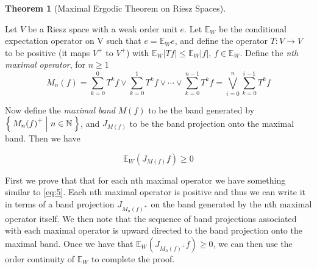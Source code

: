 \documentclass[letterpaper,10pt,oneside,onecolumn,reqno]{amsart}
\newcommand{\E}{\mathbb E}
\newcommand{\NN}{\mathbb N}
\theoremstyle{definition}
\newtheorem{thm}{Theorem}
\newcommand{\join}{\vee}
\begin{document}
\begin{thm}[Maximal Ergodic Theorem on Riesz Spaces]\label{thr:3}

  Let $V$ be a Riesz space with a weak order unit $e$. Let $\E_W$ be
  the conditional expectation operator on V such that $e = \E_W e$,
  and define the operator $T : V \to V$ to be positive (it maps $V^+$
  to $V^+$) with $\E_W|Tf| \leq \E_W|f|$, $f \in \E_W$. Define the
  \emph{nth maximal operator}, for $n \geq
  1$
  \begin{equation}\label{eq:4}
    M_n(f) = \sum\limits_{k=0}^{0} T^k f \join \sum\limits_{k=0}^{1} T^k f \join \cdots \join \sum\limits_{k=0}^{n-1} T^k f = \bigvee_{i=0}^n \sum\limits_{k=0}^{i-1} T^k f
  \end{equation}

  Now define the \emph{maximal band} $M(f)$ to be
  the band generated by $\Set{M_n{(f)}^+ | n \in \NN}$, and $J_{M(f)}$
  to be the band projection onto the maximal band. Then we have

\begin{equation}\label{eq:5}
  \E_W(J_{M(f)}f) \geq 0
\end{equation}
\end{thm}

\begin{framed}
  First we prove that that for each nth maximal operator we have
  something similar to \eqref{eq:5}. Each nth maximal operator is
  positive and thus we can write it in terms of a band projection
  $J_{M_n{(f)}^+}$ on the band generated by the nth maximal operator
  itself. We then note that the sequence of band projections
  associated with each maximal operator is upward directed to the band
  projection onto the maximal band. Once we have that
  $\E_W(J_{M_n{(f)}^+}f) \geq 0$, we can then use the order continuity
  of $\E_W$ to complete the proof.
\end{framed}
\end{document}
